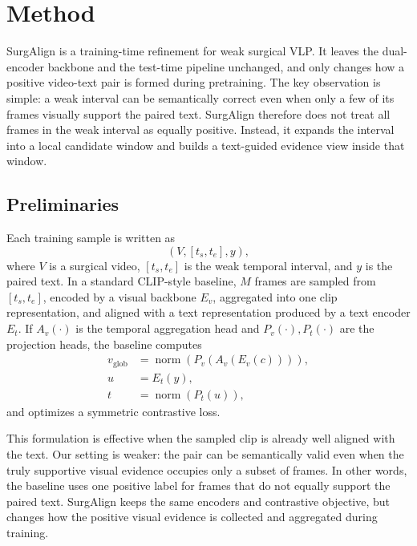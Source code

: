 \section{Method}
\label{sec:method}

SurgAlign is a training-time refinement for weak surgical VLP. It leaves the dual-encoder backbone and the test-time pipeline unchanged, and only changes how a positive video-text pair is formed during pretraining. The key observation is simple: a weak interval can be semantically correct even when only a few of its frames visually support the paired text. SurgAlign therefore does not treat all frames in the weak interval as equally positive. Instead, it expands the interval into a local candidate window and builds a text-guided evidence view inside that window.

\subsection{Preliminaries}
\label{sec:method_setup}

Each training sample is written as
\begin{equation}
(V, [t_s, t_e], y),
\end{equation}
where $V$ is a surgical video, $[t_s, t_e]$ is the weak temporal interval, and $y$ is the paired text. In a standard CLIP-style baseline, $M$ frames are sampled from $[t_s, t_e]$, encoded by a visual backbone $E_v$, aggregated into one clip representation, and aligned with a text representation produced by a text encoder $E_t$. If $A_v(\cdot)$ is the temporal aggregation head and $P_v(\cdot), P_t(\cdot)$ are the projection heads, the baseline computes
\begin{equation}
\begin{aligned}
v_{\mathrm{glob}} &= \operatorname{norm}\!\left(P_v(A_v(E_v(c)))\right),\\
u &= E_t(y),\\
t &= \operatorname{norm}\!\left(P_t(u)\right),
\end{aligned}
\end{equation}
and optimizes a symmetric contrastive loss.

This formulation is effective when the sampled clip is already well aligned with the text. Our setting is weaker: the pair can be semantically valid even when the truly supportive visual evidence occupies only a subset of frames. In other words, the baseline uses one positive label for frames that do not equally support the paired text. SurgAlign keeps the same encoders and contrastive objective, but changes how the positive visual evidence is collected and aggregated during training.


